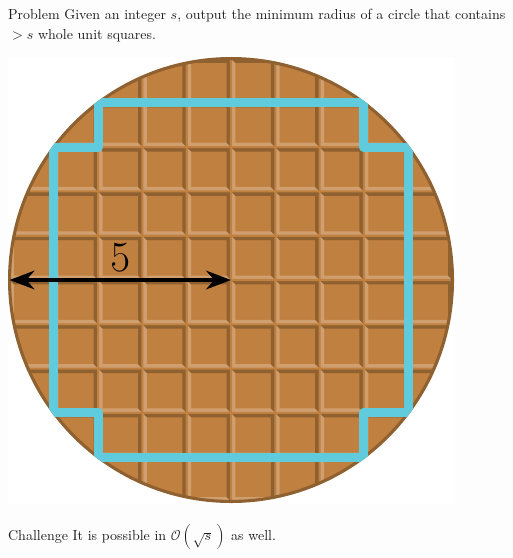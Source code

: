 \begin{frame}
    \frametitle{\problemtitle}
    \begin{block}{Problem}
        Given an integer $s$, output the minimum radius of a circle that contains $> s$ whole unit squares.
    \end{block}

    \begin{center}
        \includegraphics[height=0.35\textheight]{sample}
    \end{center}

    \begin{block}{Challenge}
        It is possible in $\mathcal O(\sqrt s)$ as well.
    \end{block}
    \pause
    \solvestats
\end{frame}
